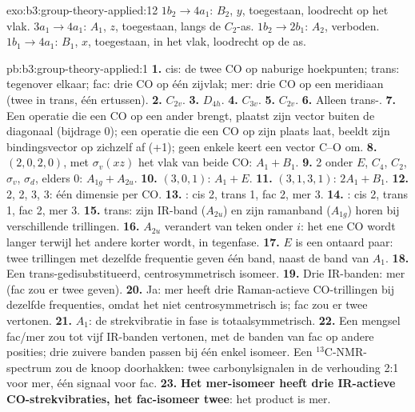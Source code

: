 \begin{solution}{exo:b3:group-theory-applied:12}
$1b_2 \to 4a_1$: $B_2$, $y$, toegestaan, loodrecht op het vlak. $3a_1 \to 4a_1$:
$A_1$, $z$, toegestaan, langs de $C_2$-as. $1b_2 \to 2b_1$: $A_2$, verboden.
$1b_1 \to 4a_1$: $B_1$, $x$, toegestaan, in het vlak, loodrecht op de as.
\end{solution}

\begin{solution}{pb:b3:group-theory-applied:1}
\textbf{1.} cis: de twee CO op naburige hoekpunten; trans: tegenover
elkaar; fac: drie CO op één zijvlak; mer: drie CO op een meridiaan (twee
in trans, één ertussen).
\textbf{2.} $C_{2v}$.
\textbf{3.} $D_{4h}$.
\textbf{4.} $C_{3v}$.
\textbf{5.} $C_{2v}$.
\textbf{6.} Alleen trans-.
\textbf{7.} Een operatie die een CO op een ander brengt, plaatst zijn
vector buiten de diagonaal (bijdrage 0); een operatie die een CO op zijn
plaats laat, beeldt zijn bindingsvector op zichzelf af (+1); geen enkele
keert een vector C--O om.
\textbf{8.}  $(2, 0, 2, 0)$, met $\sigma_v(xz)$ het vlak van beide CO: $A_1 +
B_1$.
\textbf{9.}  2 onder $E$, $C_4$, $C_2$, $\sigma_v$, $\sigma_d$, elders 0:
$A_{1g} + A_{2u}$.
\textbf{10.} $(3, 0, 1)$: $A_1 + E$.
\textbf{11.} $(3, 1, 3, 1)$: $2A_1 + B_1$.
\textbf{12.} 2, 2, 3, 3: één dimensie per CO.
\textbf{13.} : cis 2, trans 1, fac 2, mer 3.
\textbf{14.} : cis 2, trans 1, fac 2, mer 3.
\textbf{15.} trans: zijn IR-band ($A_{2u}$) en zijn ramanband ($A_{1g}$) horen
bij verschillende trillingen.
\textbf{16.} $A_{2u}$ verandert van teken onder $i$: het ene CO wordt
langer terwijl het andere korter wordt, in tegenfase.
\textbf{17.} $E$ is een ontaard paar: twee trillingen met dezelfde
frequentie geven één band, naast de band van $A_1$.
\textbf{18.} Een trans-gedisubstitueerd, centrosymmetrisch isomeer.
\textbf{19.} Drie IR-banden: mer (fac zou er twee geven).
\textbf{20.} Ja: mer heeft drie Raman-actieve CO-trillingen bij dezelfde
frequenties, omdat het niet centrosymmetrisch is; fac zou er twee vertonen.
\textbf{21.} $A_1$: de strekvibratie in fase is totaalsymmetrisch.
\textbf{22.} Een mengsel fac/mer zou tot vijf IR-banden vertonen, met de
banden van fac op andere posities; drie zuivere banden passen bij één
enkel isomeer. Een
${}^{13}$C-NMR-spectrum zou de knoop doorhakken: twee carbonylsignalen in
de verhouding 2:1 voor
mer, één signaal voor fac.
\textbf{23.} \textbf{Het mer-isomeer heeft drie IR-actieve
CO-strekvibraties, het fac-isomeer twee}: het product is mer.
\end{solution}
